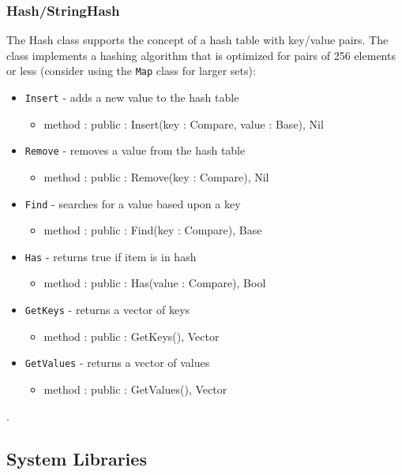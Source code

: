 \documentclass[12pt]{article}
\begin{document}
\subsubsection{Hash/StringHash}
The Hash class supports the concept of a hash table with key/value pairs.  The class implements a hashing algorithm that is optimized for pairs of 256 elements or less  (consider using the \texttt{Map} class for larger sets):
\begin{itemize}
\item \texttt{Insert} - adds a new value to the hash table
  \begin{itemize}
  \item method : public : Insert(key : Compare, value : Base), Nil
  \end{itemize}
\item \texttt{Remove} - removes a value from the hash table
  \begin{itemize}
  \item method : public : Remove(key : Compare), Nil
  \end{itemize}
\item \texttt{Find} - searches for a value based upon a key
  \begin{itemize}
  \item method : public : Find(key : Compare), Base
  \end{itemize}
\item \texttt{Has} - returns true if item is in hash
  \begin{itemize}
  \item method : public : Has(value : Compare), Bool
  \end{itemize}
\item \texttt{GetKeys} - returns a vector of keys
  \begin{itemize}
  \item method : public : GetKeys(), Vector
  \end{itemize}
\item \texttt{GetValues} - returns a vector of values
  \begin{itemize}
  \item method : public : GetValues(), Vector
  \end{itemize}
\end{itemize}.

\subsection{System Libraries}
\end{document}
